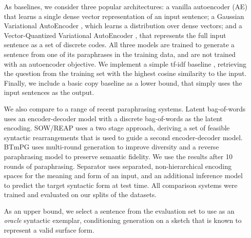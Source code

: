 \documentclass[11pt]{article}
\begin{document}
As baselines, we consider three popular architectures: a vanilla autoencoder (AE) that learns a single dense vector representation of an input sentence; a Gaussian Variational AutoEncoder \citep[VAE,][]{bowman-ppvae}, which learns a distribution over dense vectors; and a Vector-Quantized Variational AutoEncoder \citep[VQ-VAE,][]{vqvae}, that represents the full input sentence as a set of discrete codes. All three models are trained to generate a sentence from one of its paraphrases in the training data, and are not trained with an autoencoder objective. We implement a simple \mbox{tf-idf} baseline
\cite{tfidf}, retrieving the question from the training set with the
highest cosine similarity to the input. Finally, we include a basic copy baseline as a lower bound, that simply uses the input sentences as the output.

We also compare to a range of recent paraphrasing systems. Latent
bag-of-words \citep[BoW,][]{latentbow} uses an encoder-decoder model
with a discrete bag-of-words as the latent encoding. SOW/REAP
\cite{goyal_neural_2020} uses a two stage approach, deriving a set of
feasible syntactic rearrangements that is used to guide a second
encoder-decoder model. BTmPG \cite{lin-wan-2021-pushing} uses
multi-round generation to improve diversity and a reverse paraphrasing
model to preserve semantic fidelity. We use the results after 10
rounds of paraphrasing. Separator
\cite{hosking-lapata-2021-factorising} uses separated,
non-hierarchical encoding spaces for the meaning and form of an input,
and an additional inference model to predict the target syntactic form
at test time. All comparison systems were trained and evaluated on our
splits of the datasets.

As an upper bound, we select a sentence from the evaluation set to use as an \textit{oracle} syntactic exemplar, conditioning generation on a sketch that is known to represent a valid surface form.
\end{document}
